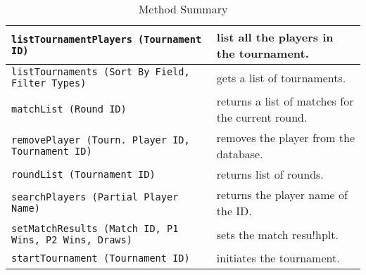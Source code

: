 \documentclass[11pt]{article}
\begin{document}
\begin{table*}[!hp]
\begin{tabulary}{0.9\textwidth}{|p{27em}|p{16em}|}
                        \texttt{listTournamentPlayers (Tournament ID)}                  & list all the players in the tournament.\\
                        \hline
                        \texttt{listTournaments (Sort By Field, Filter Types)}          & gets a list of tournaments.\\
                        \hline
                        \texttt{matchList (Round ID)}                                   & returns a list of matches for the current round.\\
                        \hline
                        \texttt{removePlayer (Tourn. Player ID, Tournament ID)}         & removes the player from the database.\\
                        \hline
                        \texttt{roundList (Tournament ID)}                              & returns list of rounds.\\
                        \hline
                        \texttt{searchPlayers (Partial Player Name)}                    & returns the player name of the ID.\\
                        \hline
                        \texttt{setMatchResults (Match ID, P1 Wins, P2 Wins, Draws)}    & sets the match resu!hplt.\\
                        \hline
                        \texttt{startTournament (Tournament ID)}                        & initiates the tournament.\\
                        \hline
                    \end{tabulary}
                    \caption{Method Summary}
                \end{table*}

            \newpage
\end{document}
